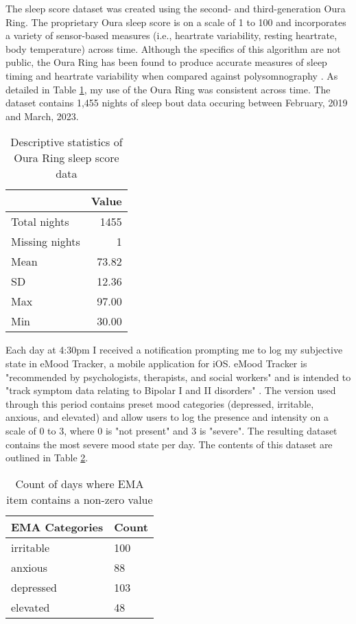\documentclass{article}
\begin{document}
The sleep score dataset was created using the second- and third-generation Oura
Ring. The proprietary Oura sleep score is on a scale of 1 to 100 and
incorporates a variety of sensor-based measures (i.e., heartrate variability,
resting heartrate, body temperature) across time. Although the specifics of this
algorithm are not public, the Oura Ring has been found to produce
accurate measures of sleep timing and heartrate variability when compared
against polysomnography \citep{dezambottiSleep2019}. As detailed in Table
\ref{Sleep}, my use of the Oura Ring was consistent across time. The dataset
contains 1,455 nights of sleep bout data occuring between February, 2019 and
March, 2023.

\begin{table}[hb]
  \centering
  \begin{tabular}{lr}
  \toprule
     & \textbf{Value}\\ \midrule
      Total nights & 1455 \\
      Missing nights & 1 \\
      Mean & 73.82 \\
      SD & 12.36 \\
      Max & 97.00 \\
      Min & 30.00 \\
   \bottomrule
  \end{tabular}
\caption{Descriptive statistics of Oura Ring sleep score data}
\label{Sleep}
\end{table}

Each day at 4:30pm I received a notification prompting me to log my subjective
state in eMood Tracker, a mobile application for iOS. eMood Tracker is
"recommended by psychologists, therapists, and social workers" and is intended
to "track symptom data relating to Bipolar I and II disorders"
\citep{eMoods2023}. The version used through this period contains preset mood
categories (depressed, irritable, anxious, and elevated) and allow users to log
the presence and intensity on a scale of 0 to 3, where 0 is "not present" and 3
is "severe". The resulting dataset contains the most severe mood state per day.
The contents of this dataset are outlined in Table \ref{EMA}.

\begin{table}
    \centering
    \begin{tabular}{ll}
    \toprule
        \textbf{EMA Categories} & \textbf{Count} \\ \midrule
        irritable & 100 \\
        anxious & 88  \\
        depressed & 103  \\
        elevated & 48  \\
        \bottomrule
    \end{tabular}
\caption{Count of days where EMA item contains a non-zero value}
\label{EMA}
\end{table}
\end{document}
